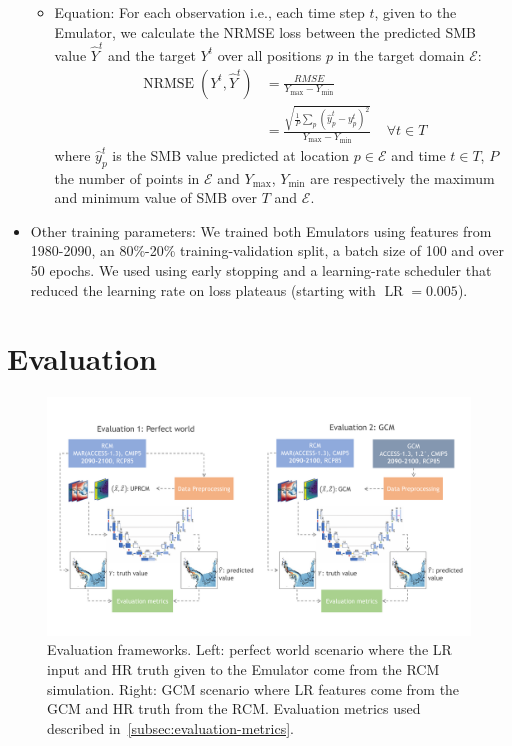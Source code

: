 \documentclass[a4paper,11pt,oneside]{report}
\begin{document}
\begin{itemize}
\begin{itemize}
        \item Equation: For each observation i.e., each time step $t$, given to the Emulator, we calculate the NRMSE loss between the predicted SMB value $\hat{Y}^{t}$ and the target $Y^{t}$ over all positions $p$ in the target domain $\mathcal{E}$:
        \begin{align}
        \operatorname{NRMSE}\left(Y^{t},\hat{Y}^{t}\right) &= \frac{RMSE}{Y_{\max} - Y_{\min}} \\
         &=\frac{\sqrt{\frac{1}{P}\sum_{p}(\hat{y}_{p}^{t}-y^{t}_{p})^2}}{Y_{\max} - Y_{\min}}   \;\;\;\; \forall t \in T
        \end{align}
        where $\hat{y}_{p}^{t}$ is the SMB value predicted at location $p\in \mathcal{E}$ and time $t \in T$, $P$ the number of points in $\mathcal{E}$ and $Y_{\max}$, $Y_{\min}$ are respectively the maximum and minimum value of SMB over $T$ and $\mathcal{E}$.
    \end{itemize}
    \item Other training parameters: We trained both Emulators using features from 1980-2090, an 80\%-20\% training-validation split, a batch size of 100 and over 50 epochs. We used using early stopping and a learning-rate scheduler that reduced the learning rate on loss plateaus (starting with $\operatorname{LR} = 0.005$). 
\end{itemize}

\section{Evaluation}\label{sec:evaluation}

\begin{figure}[!t]
  \centering
  \includegraphics[width=\columnwidth]{doc/Thesis-latex/images/results/evaluation_framework.pdf}
  \caption []{\small Evaluation frameworks. Left: perfect world scenario where the LR input and HR truth given to the Emulator come from the RCM simulation. Right: GCM scenario where LR features come from the GCM and HR truth from the RCM. Evaluation metrics used described in~\ref{subsec:evaluation-metrics}.}
  \vspace{-3mm}
  \label{fig:evaluation-framework}
\end{figure}
\end{document}
